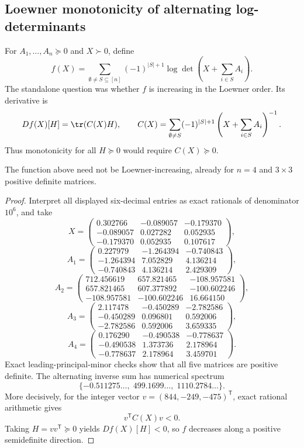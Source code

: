 \subsection{Loewner monotonicity of alternating log-determinants}

For $A_1,\ldots,A_n\succeq0$ and $X\succ0$, define
\[
f(X)=\sum_{\emptyset\ne S\subseteq[n]}(-1)^{|S|+1}
\log\det\left(X+\sum_{i\in S}A_i\right).
\]
The standalone question was whether $f$ is increasing in the Loewner order.  Its derivative is
\[
Df(X)[H]=\tr(C(X)H),\qquad
C(X)=\sum_{\emptyset\ne S}(-1)^{|S|+1}
\left(X+\sum_{i\in S}A_i\right)^{-1}.
\]
Thus monotonicity for all $H\succeq0$ would require $C(X)\succeq0$.

\begin{theorem}\label{thm:logdet}
The function above need not be Loewner-increasing, already for $n=4$ and $3\times3$ positive definite matrices.
\end{theorem}
\begin{proof}
Interpret all displayed six-decimal entries as exact rationals of denominator $10^6$, and take
\[
X=\begin{pmatrix}
0.302766&-0.089057&-0.179370\\
-0.089057&0.027282&0.052935\\
-0.179370&0.052935&0.107617
\end{pmatrix},
\]
\[
A_1=\begin{pmatrix}
0.227979&-1.264394&-0.740843\\
-1.264394&7.052829&4.136214\\
-0.740843&4.136214&2.429309
\end{pmatrix},
\]
\[
A_2=\begin{pmatrix}
712.456619&657.821465&-108.957581\\
657.821465&607.377892&-100.602246\\
-108.957581&-100.602246&16.664150
\end{pmatrix},
\]
\[
A_3=\begin{pmatrix}
2.117478&-0.450289&-2.782586\\
-0.450289&0.096801&0.592006\\
-2.782586&0.592006&3.659335
\end{pmatrix},
\]
\[
A_4=\begin{pmatrix}
0.176290&-0.490538&-0.778637\\
-0.490538&1.373736&2.178964\\
-0.778637&2.178964&3.459701
\end{pmatrix}.
\]
Exact leading-principal-minor checks show that all five matrices are positive definite.  The alternating inverse sum has numerical spectrum
\[
\{-0.511275\ldots,\;499.1699\ldots,\;1110.2784\ldots\}.
\]
More decisively, for the integer vector $v=(844,-249,-475)^{\mathsf T}$, exact rational arithmetic gives
\[
v^{\mathsf T}C(X)v<0.
\]
Taking $H=vv^{\mathsf T}\succeq0$ yields $Df(X)[H]<0$, so $f$ decreases along a positive semidefinite direction.
\end{proof}
